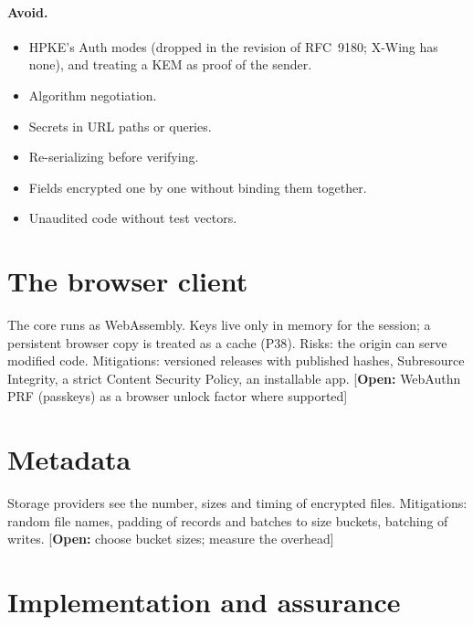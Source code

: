 \documentclass[11pt,a4paper]{article}
\newcommand{\todo}[1]{\textcolor{red!70!black}{[\textbf{Open:} #1]}}
\newcommand{\dref}[1]{\textsf{#1}} %
\begin{document}
\paragraph{Avoid.}
\begin{itemize}
  \item HPKE's Auth modes (dropped in the revision of RFC~9180; X-Wing has none), and treating a KEM as proof of the sender.
  \item Algorithm negotiation.
  \item Secrets in URL paths or queries.
  \item Re-serializing before verifying.
  \item Fields encrypted one by one without binding them together.
  \item Unaudited code without test vectors.
\end{itemize}


\section{The browser client}
\label{sec:web}
The core runs as WebAssembly. Keys live only in memory for the session; a persistent browser copy is treated as a cache (\dref{P38}). Risks: the origin can serve modified code. Mitigations: versioned releases with published hashes, Subresource Integrity, a strict Content Security Policy, an installable app. \todo{WebAuthn PRF (passkeys) as a browser unlock factor where supported}

\section{Metadata}
\label{sec:metadata}
Storage providers see the number, sizes and timing of encrypted files. Mitigations: random file names, padding of records and batches to size buckets, batching of writes. \todo{choose bucket sizes; measure the overhead}

\section{Implementation and assurance}
\label{sec:assurance}
\end{document}
